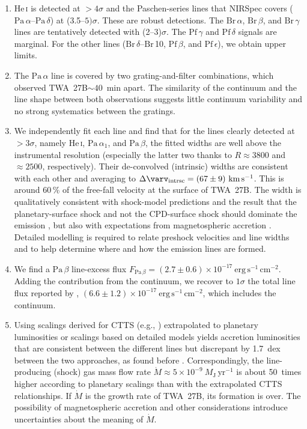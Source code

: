 \documentclass[twocolumn,twocolumnappendix]{aastex631}
\newcommand{\neuI}[1]{{\leavevmode{\boldmath\bfseries#1}}}
\renewcommand{\neuI}[1]{{\leavevmode#1}}
\def\MJ{\ensuremath{M_{\textrm{J}}}\xspace}        %
\def\Paa{\ensuremath{\mathrm{Pa}\,\alpha}\xspace}           %
\def\Pab{\ensuremath{\mathrm{Pa}\,\beta}\xspace}            %
\def\Pad{\ensuremath{\mathrm{Pa}\,\delta}\xspace}           %
\def\Bra{\ensuremath{\mathrm{Br}\,\alpha}\xspace}           %
\def\Brb{\ensuremath{\mathrm{Br}\,\beta}\xspace}            %
\def\Brg{\ensuremath{\mathrm{Br}\,\gamma}\xspace}           %
\def\Brd{\ensuremath{\mathrm{Br}\,\delta}\xspace}           %
\def\Brz{\ensuremath{\mathrm{Br}}\,10\xspace}               %
\def\Pfb{\ensuremath{\mathrm{Pf}\,\beta}\xspace}            %
\def\Pfg{\ensuremath{\mathrm{Pf}\,\gamma}\xspace}           %
\def\Pfd{\ensuremath{\mathrm{Pf}\,\delta}\xspace}           %
\def\Pfe{\ensuremath{\mathrm{Pf}\,\epsilon}\xspace}         %
\def\HeI{\ensuremath{\mathrm{He}}\,\textsc{i}\xspace}       %
\def\HeIt{\HeI}                     %
\def\MPkt{\ensuremath{\dot{M}}\xspace}                               %
\def\FPab{\ensuremath{F_{\textrm{Pa}\,\beta}}\xspace}    %
\def\Dvint{\ensuremath{\Delta \varv_{\mathrm{intrsc}}}\xspace}
\def\kms{\ensuremath{\textrm{km}\,\textrm{s}^{-1}}\xspace}    %
\def\MPktEJ{\ensuremath{\MJ\,\textrm{yr}^{-1}}\xspace}        %
\def\FEcgs{\ensuremath{\textrm{erg}\,\textrm{s}^{-1}\,\textrm{cm}^{-2}}\xspace}
\def\twb{TWA~27B\xspace}
\begin{document}
\begin{enumerate}
  
  \item \HeIt is detected at $>4\sigma$ and the Paschen-series lines that NIRSpec covers (\Paa--\Pad) at (3.5--$5)\sigma$. These are robust detections. The \Bra, \Brb, and \Brg lines are tentatively detected with (2--3)$\sigma$. The \Pfg and \Pfd signals are marginal. For the other lines (\Brd--\Brz, \Pfb, and \Pfe), we obtain upper limits.

  \item The \Paa line is covered by two grating-and-filter combinations, which observed \twb $\sim40$~min apart. The similarity of the continuum and the line shape between both observations suggests little continuum variability and no strong systematics between the gratings.

  \item 
  We independently fit each line and find that for the
  lines clearly detected at $>3\sigma$, namely \HeIt, $\Paa_1$, and \Pab, the fitted widths are well above the instrumental resolution (especially the latter two thanks to $R\approx3800$ and $\approx2500$, respectively).
  Their de-convolved (intrinsic) widths are consistent with each other and averaging to $\Dvint=(67\pm9)~\kms$. This is around 60\,\% of the free-fall velocity at the surface of \twb.
  The width is qualitatively consistent with shock-model predictions \citep{aoyama18} and the result that the planetary-surface shock and not the CPD-surface shock should dominate the emission \citep{m22Schock}, but also with expectations from magnetospheric accretion \citep{thanathibodee19}.
  Detailed modelling is required to relate preshock velocities and line widths and to help determine where and how the emission lines are formed.
 
  \item We find a \Pab line-excess flux $\FPab=(2.7\pm0.6)\times10^{-17}~\FEcgs$.
  Adding the contribution from the continuum,
  we recover to $1\sigma$ the total line flux reported by \citet{luhman23c},
  $(6.6\pm1.2)\times10^{-17}~\FEcgs$, \neuI{which includes the continuum}.
  

  \item Using scalings derived for CTTS (e.g., \citealp{alcal17}) extrapolated to planetary luminosities or scalings based on detailed models yields accretion luminosities that are consistent between the different lines but discrepant by 1.7~dex between the two approaches, as found before \citep{betti22b,betti22c}.
  Correspondingly, the line-producing (shock) gas mass flow rate $\MPkt\approx5\times10^{-9}~\MPktEJ$ is about 50~times higher according to planetary scalings than with the extrapolated CTTS relationships. If \MPkt is the growth rate of \twb, its formation is over. The possibility of magnetospheric accretion and other considerations introduce uncertainties about the meaning of \MPkt.
  

\end{enumerate}
\end{document}
